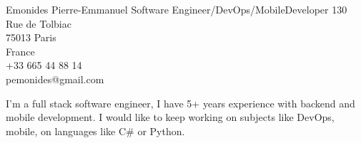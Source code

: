 \documentclass{emonides-cv}
\begin{document}
  
  {Emonides} {Pierre-Emmanuel}
  {Software Engineer/DevOps/MobileDeveloper}
  { 130 Rue de Tolbiac\\
    75013 Paris\\
    France\\
    +33 665 44 88 14\\
    pemonides@gmail.com\\
    }

I'm a full stack software engineer, I have 5+ years experience with backend and mobile development.
I would like to keep working on subjects like DevOps, mobile, on languages like C\# or Python.   
 
\end{document}
